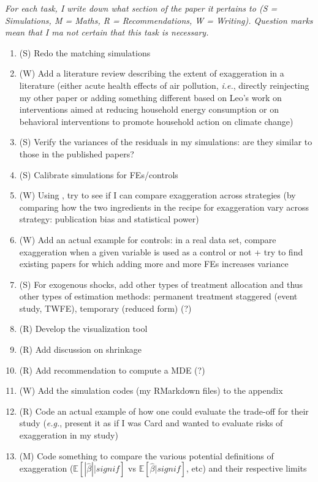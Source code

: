\documentclass[usletter, 12pt]{article}
\begin{document}
	\textit{For each task, I write down what section of the paper it pertains to (S = Simulations, M = Maths, R = Recommendations, W = Writing). Question marks mean that I ma not certain that this task is necessary.}\\

	\begin{enumerate}
		\item (S) Redo the matching simulations
		\item (W) Add a literature review describing the extent of exaggeration in a literature (either acute health effects of air pollution, \textit{i.e.}, directly reinjecting my other paper or adding something different  based on Leo's work on interventions aimed at reducing household energy consumption or on behavioral interventions to promote household action on climate change)
		\item (S) Verify the variances of the residuals in my simulations: are they similar to those in the published papers?
		\item (S) Calibrate simulations for FEs/controls
		\item (W) Using \cite{brodeur_methods_2020}, try to see if I can compare exaggeration across strategies (by comparing how the two ingredients in the recipe for exaggeration vary across strategy: publication bias and statistical power)
		\item (W) Add an actual example for controls: in a real data set, compare exaggeration when a given variable is used as a control or not + try to find existing papers for which adding more and more FEs increases variance
		\item (S) For exogenous shocks, add other types of treatment allocation and thus other types of estimation methods: permanent treatment staggered (event study, TWFE), temporary (reduced form) (?)
		\item (R) Develop the visualization tool
		\item (R) Add discussion on shrinkage
		\item (R) Add recommendation to compute a MDE (?)
		\item (W) Add the simulation codes (my RMarkdown files) to the appendix
		\item (R) Code an actual example of how one could evaluate the trade-off for their study (\textit{e.g.}, present it as if I was Card and wanted to evaluate risks of exaggeration in my study)
		\item (M) Code something to compare the various potential definitions of exaggeration ($\mathbb{E}[ |\hat{\beta} | | signif]$ vs $\mathbb{E}[\hat{\beta}  | signif]$, etc) and their respective limits
	\end{enumerate}
\end{document}
